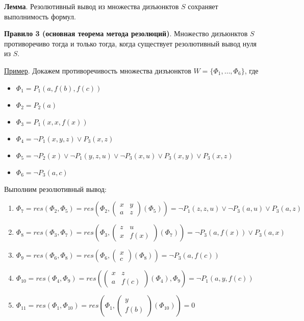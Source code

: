 \textbf{Лемма}. Резолютивный вывод из множества дизъюнктов $S$ сохраняет выполнимость формул.

\textbf{Правило 3 (основная теорема метода резолюций)}.
Множество дизъюнктов $S$ противоречиво тогда и только тогда, когда существует резолютивный вывод нуля из $S$.

\underline{Пример}. Докажем противоречивость множества дизъюнктов $W = \{\Phi_1, \dots, \Phi_6\}$, где
\begin{itemize}
    \item $\Phi_1 = P_1(a, f(b), f(c))$
    \item $\Phi_2 = P_2(a)$
    \item $\Phi_3 = P_1(x, x, f(x))$
    \item $\Phi_4 = \lnot P_1(x, y, z) \lor P_3(x, z)$
    \item $\Phi_5 = \lnot P_2(x) \lor \lnot P_1(y, z, u) \lor \lnot P_3(x, u) \lor P_3(x, y) \lor P_3(x, z)$
    \item $\Phi_6 = \lnot P_3(a, c)$
\end{itemize}
Выполним резолютивный вывод:
\begin{enumerate}
    \item $\Phi_7 = res(\Phi_2, \Phi_5) = res(\Phi_2, \left(
        \begin{matrix}
            x & y \\
            a & z
        \end{matrix}
    \right)(\Phi_5)) = \lnot P_1(z, z, u) \lor \lnot P_3(a, u) \lor P_3(a, z)$
    \item $\Phi_8 = res(\Phi_3, \Phi_7) = res(\Phi_3, \left(
        \begin{matrix}
            z & u \\
            x & f(x)
        \end{matrix}
    \right)(\Phi_7)) = \lnot P_3(a, f(x)) \lor P_3(a, x)$
    \item $\Phi_9 = res(\Phi_6, \Phi_8) = res(\Phi_6, \left(
        \begin{matrix}
            x \\
            c
        \end{matrix}
    \right)(\Phi_8)) = \lnot P_3(a, f(c))$
    \item $\Phi_{10} = res(\Phi_4, \Phi_9) = res(\left(
        \begin{matrix}
            x & z \\
            a & f(c)
        \end{matrix}
    \right)(\Phi_4), \Phi_9) = \lnot P_1(a, y, f(c))$
    \item $\Phi_{11} = res(\Phi_1, \Phi_{10}) = res(\Phi_1, \left(
        \begin{matrix}
            y \\
            f(b)
        \end{matrix}
    \right)(\Phi_{10})) = 0$
\end{enumerate}

